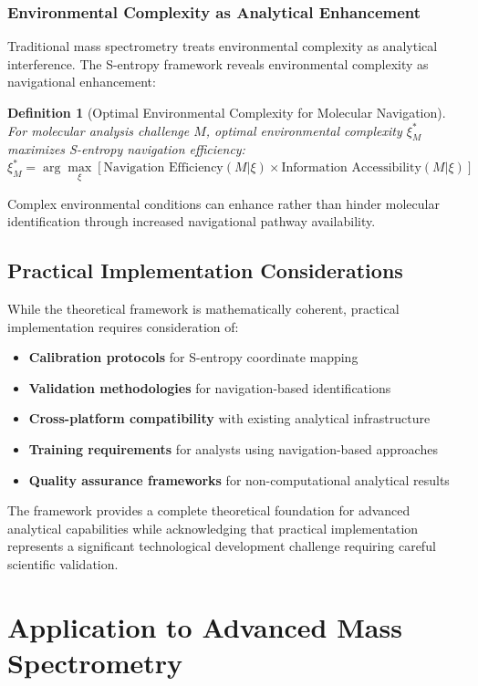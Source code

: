 \documentclass[11pt,a4paper]{article}
\newtheorem{definition}[theorem]{Definition}
\theoremstyle{remark}
\begin{document}
\subsubsection{Environmental Complexity as Analytical Enhancement}

Traditional mass spectrometry treats environmental complexity as analytical interference. The S-entropy framework reveals environmental complexity as navigational enhancement:

\begin{definition}[Optimal Environmental Complexity for Molecular Navigation]
For molecular analysis challenge $M$, optimal environmental complexity $\xi_M^*$ maximizes S-entropy navigation efficiency:
$$\xi_M^* = \arg\max_\xi \left[\text{Navigation Efficiency}(M|\xi) \times \text{Information Accessibility}(M|\xi)\right]$$
\end{definition}

Complex environmental conditions can enhance rather than hinder molecular identification through increased navigational pathway availability.

\subsection{Practical Implementation Considerations}

While the theoretical framework is mathematically coherent, practical implementation requires consideration of:

\begin{itemize}
\item \textbf{Calibration protocols} for S-entropy coordinate mapping
\item \textbf{Validation methodologies} for navigation-based identifications  
\item \textbf{Cross-platform compatibility} with existing analytical infrastructure
\item \textbf{Training requirements} for analysts using navigation-based approaches
\item \textbf{Quality assurance frameworks} for non-computational analytical results
\end{itemize}

The framework provides a complete theoretical foundation for advanced analytical capabilities while acknowledging that practical implementation represents a significant technological development challenge requiring careful scientific validation.

\section{Application to Advanced Mass Spectrometry}
\end{document}
